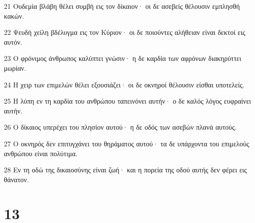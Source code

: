 \par 21 Ουδεμία βλάβη θέλει συμβή εις τον δίκαιον· οι δε ασεβείς θέλουσιν εμπλησθή κακών.
\par 22 Ψευδή χείλη βδέλυγμα εις τον Κύριον· οι δε ποιούντες αλήθειαν είναι δεκτοί εις αυτόν.
\par 23 Ο φρόνιμος άνθρωπος καλύπτει γνώσιν· η δε καρδία των αφρόνων διακηρύττει μωρίαν.
\par 24 Η χειρ των επιμελών θέλει εξουσιάζει· οι δε οκνηροί θέλουσιν είσθαι υποτελείς.
\par 25 Η λύπη εν τη καρδία του ανθρώπου ταπεινόνει αυτήν· ο δε καλός λόγος ευφραίνει αυτήν.
\par 26 Ο δίκαιος υπερέχει του πλησίον αυτού· η δε οδός των ασεβών πλανά αυτούς.
\par 27 Ο οκνηρός δεν επιτυγχάνει του θηράματος αυτού· τα δε υπάρχοντα του επιμελούς ανθρώπου είναι πολύτιμα.
\par 28 Εν τη οδώ της δικαιοσύνης είναι ζωή· και η πορεία της οδού αυτής δεν φέρει εις θάνατον.

\chapter{13}

